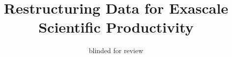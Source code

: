 \documentclass{sig-alt-gov2}
\begin{document}

\title{Restructuring Data for Exascale Scientific Productivity}

\author{blinded for review}
\maketitle
\end{document}
